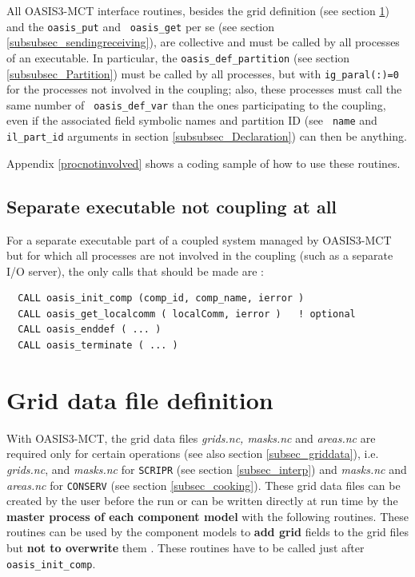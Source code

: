 All OASIS3-MCT interface routines, besides the grid definition (see
section \ref{subsubsec_griddef}) and the {\tt oasis\_put} and {\tt
  oasis\_get} per se (see section \ref{subsubsec_sendingreceiving}),
are collective and must be called by all processes of an executable.
In particular, the {\tt oasis\_def\_partition} (see section
\ref{subsubsec_Partition}) must be called by all processes, but with
{\tt ig\_paral(:)=0} for the processes not involved in the coupling;
also, these processes must call the same number of {\tt
  oasis\_def\_var} than the ones participating to the coupling, even
if the associated field symbolic names and partition ID (see {\tt
  name} and {\tt il\_part\_id} arguments in section
\ref{subsubsec_Declaration}) can then be anything.

Appendix \ref{procnotinvolved} shows a coding sample of how to use
these routines.

\subsection{Separate executable not coupling at all}
\label{subsec_nocpl}

For a separate executable part of a coupled system managed by
OASIS3-MCT but for which all processes are not involved in the
coupling (such as a separate I/O server), the only calls that should
be made are :

\begin{verbatim}
  CALL oasis_init_comp (comp_id, comp_name, ierror )
  CALL oasis_get_localcomm ( localComm, ierror )   ! optional
  CALL oasis_enddef ( ... )
  CALL oasis_terminate ( ... )
\end{verbatim}

\section{Grid data file definition}
\label{subsubsec_griddef}

With OASIS3-MCT, the grid data files {\em grids.nc, masks.nc} and {\em
  areas.nc} are required only for certain operations (see also section
\ref{subsec_griddata}), i.e.  {\em grids.nc}, and {\em masks.nc} for
{\tt SCRIPR} (see section \ref{subsec_interp}) and {\em masks.nc} and
{\em areas.nc} for {\tt CONSERV} (see section
\ref{subsec_cooking}). These grid data files can be created by the
user before the run or can be written directly at run time by the {\bf
  master process of each component model} with the following routines.
These routines can be used by the component models to {\bf add grid}
fields to the grid files but {\bf not to overwrite} them . These
routines have to be called just after {\tt oasis\_init\_comp}.

